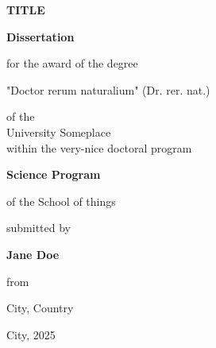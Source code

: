 \begin{titlepage}
    \begin{centering}
    \thispagestyle{empty}
    
    
	{\LARGE \textbf{
	{TITLE}
	}\par}
	\vspace{1cm}
	
	\begin{figure}[H]
        \centering
    \end{figure}
	
	\vspace{1cm}
	{\large{\textbf{Dissertation}}} \par
	\vspace{0.25cm} 
	for the award of the degree \par
    "Doctor rerum naturalium" (Dr. rer. nat.) \par
	\par
	\vspace{1cm}

    {of the \\University Someplace \\ within the very-nice doctoral program} \par
    \vspace{0.25cm} 
    {\large{\textbf{Science Program}}} \par
    \vspace{0.25cm} 
    {of the School of things} \par
    
    \vspace{0.25cm}
    {submitted by} \par
	{\textbf{Jane Doe}} \par 
	from \par City, Country 
	\par

	\vfill
    {City, 2025 \par}
    \vspace{0.25cm}
    \end{centering}
\end{titlepage}

